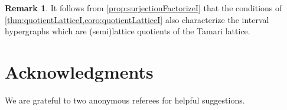 \documentclass{amsart}
\theoremstyle{definition}
\newtheorem{remark}[theorem]{Remark}
\begin{document}
\begin{remark}
It follows from \cref{prop:surjectionFactorizeI} that the conditions of \cref{thm:quotientLatticeI,coro:quotientLatticeI} also characterize the interval hypergraphs which are (semi)lattice quotients of the Tamari lattice.
\end{remark}



\section*{Acknowledgments}

We are grateful to two anonymous referees for helpful suggestions.




\label{sec:biblio}

\end{document}
